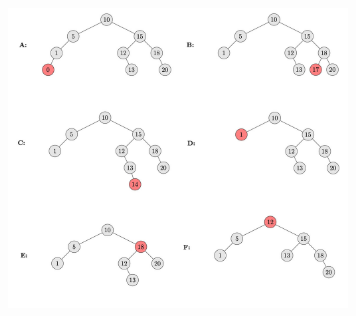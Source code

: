 \begin{Exercice}[20 minutes]
	\begin{solution}
		\centering
		\includegraphics[width=9cm]{solutions/tree_merged.jpg}
	\end{solution}
		
\end{Exercice}


